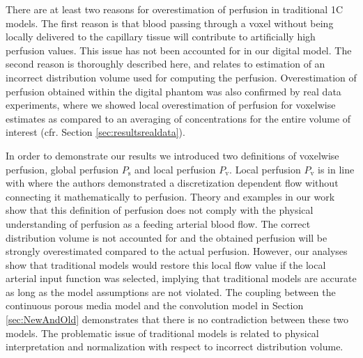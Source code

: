 \documentclass[aps,prb,article,groupedaddress,showkeys]{revtex4}
\begin{document}
	There are at least two reasons for overestimation of perfusion in traditional 1C models. The first reason is that blood passing through a voxel without being locally delivered to the capillary tissue will contribute to artificially high perfusion values. This issue has not been accounted for in our digital model. The second reason is thoroughly described here, and relates to estimation of an incorrect distribution volume used for computing the perfusion. 
	Overestimation of perfusion obtained within the digital phantom was also confirmed by real data experiments, where we showed local overestimation of perfusion for voxelwise estimates as compared to an averaging of concentrations for the entire volume of interest (cfr. Section \ref{sec:resultsrealdata}). 
	
	In order to demonstrate our results we introduced two definitions of voxelwise perfusion, global perfusion $P_{\mathrm{s}}$ and local perfusion $P_{\mathrm{v}}$. Local perfusion $P_{\mathrm{v}}$ is in line with \cite{Guibert2013} where the authors demonstrated a discretization dependent flow without connecting it mathematically to perfusion. Theory and examples in our work show that this definition of perfusion does not comply with the physical understanding of perfusion as a feeding arterial blood flow. The correct distribution volume is not accounted for and the obtained perfusion will be strongly overestimated compared to the actual perfusion. However, our analyses show that traditional models would restore this local flow value if the local arterial input function was selected, implying that traditional models are accurate as long as the model assumptions are not violated. The coupling between the continuous porous media model and the convolution model in Section \ref{sec:NewAndOld} demonstrates that there is no contradiction between these two models. The problematic issue of traditional models is related to physical interpretation and normalization with respect to incorrect distribution volume.
\end{document}
